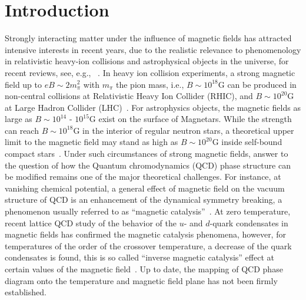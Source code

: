 
\maketitle


\section{Introduction}

Strongly interacting matter under the influence of magnetic fields has attracted intensive interests
in recent years, due to the realistic relevance to phenomenology in relativistic heavy-ion collisions
and astrophysical objects in the universe, for recent reviews, see, e.g., ~\cite{andersen2016phase,kharzeev2013strongly}.
In heavy ion collision experiments, a strong magnetic field up to $eB \sim 2m_{\pi}^2$ with $m_{\pi}$
the pion mass, i.e., $B \sim 10^{18}\text{G}$ can be produced in non-central collisions at Relativistic Heavy
Ion Collider (RHIC), and $B \sim 10^{20}\text{G}$ at Large Hadron Collider (LHC)~\cite{kharzeev2008,skokov2009}.
For astrophysics objects, the magnetic fields as large as
$B \sim 10^{14}$ - $10^{15}\text{G}$ exist on the surface of Magnetars. While the strength
can reach $B \sim 10^{18}\text{G}$ in the interior of regular neutron stars, a theoretical upper limit to the magnetic field may stand as high as $B \sim 10^{20}\text{G}$ inside self-bound compact stars~\cite{dong2001,lai1991cold}.
Under such circumstances of strong magnetic fields,
answer to the question of how the Quantum chromodynamics (QCD) phase structure can be modified remains
one of the major theoretical challenges. For instance, at vanishing chemical potential, a general effect
of magnetic field on the vacuum structure of QCD is an enhancement of the dynamical symmetry breaking,
a phenomenon usually referred to as ``magnetic catalysis''~\cite{miransky2015quantum}. At zero
temperature, recent lattice QCD study of the behavior of the $u$- and $d$-quark condensates in
magnetic fields has confirmed the magnetic catalysis phenomena, however, for temperatures of the order of
the crossover temperature, a decrease of the quark condensates is found, this is so called ``inverse
magnetic catalysis'' effect at certain values of the magnetic
field~\cite{bali2012,miransky2002,fukushima2012}.
Up to date, the mapping of QCD phase diagram onto the temperature and 
magnetic field plane has not been firmly established.


